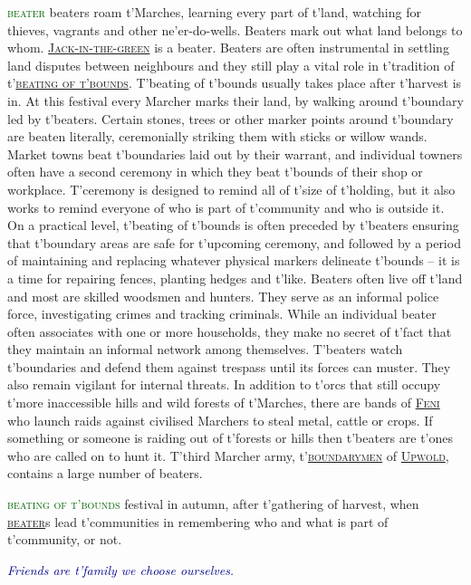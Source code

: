 \documentclass[twoside,11pt,b5paper,twocolumn]{scrbook}
\newcommand{\estcab}[1]{\textsc{\textcolor{marron}{#1}}}
\newcommand{\keyword}[1]{\textcolor{darkgreen}{#1}}
\renewcommand{\paragraph}[1]{\par\noindent\markboth{#1}{#1}\estcab{\keyword{#1}}\label{#1} }
\newcommand{\see}[1]{{\estcab{\hyperref[#1]{#1}}}}
\newcommand{\proverb}[1]{\par \textcolor{darkblue}{\itshape #1}}
\begin{document}
\paragraph{beater} beaters roam t'Marches, learning every part of t'land, watching for thieves, vagrants and other ne'er-do-wells. Beaters mark out what land belongs to whom. \see{Jack-in-the-green} is a beater. Beaters are often instrumental in settling land disputes between neighbours and they still play a vital role in t'tradition of t'\see{beating of t'bounds}. T'beating of t'bounds usually takes place after t'harvest is in. At this festival every Marcher marks their land, by walking around t'boundary led by t'beaters. Certain stones, trees or other marker points around t'boundary are beaten literally, ceremonially striking them with sticks or willow wands. Market towns beat t'boundaries laid out by their warrant, and individual towners often have a second ceremony in which they beat t'bounds of their shop or workplace. T'ceremony is designed to remind all of t'size of t'holding, but it also works to remind everyone of who is part of t'community and who is outside it. On a practical level, t'beating of t'bounds is often preceded by t'beaters ensuring that t'boundary areas are safe for t'upcoming ceremony, and followed by a period of maintaining and replacing whatever physical markers delineate t'bounds – it is a time for repairing fences, planting hedges and t'like. Beaters often live off t'land and most are skilled woodsmen and hunters. They serve as an informal police force, investigating crimes and tracking criminals. While an individual beater often associates with one or more households, they make no secret of t'fact that they maintain an informal network among themselves. T'beaters watch t'boundaries and defend them against trespass until its forces can muster. They also remain vigilant for internal threats. In addition to t'orcs that still occupy t'more inaccessible hills and wild forests of t'Marches, there are bands of \see{Feni} who launch raids against civilised Marchers to steal metal, cattle or crops. If something or someone is raiding out of t'forests or hills then t'beaters are t'ones who are called on to hunt it. T'third Marcher army, t'\see{boundarymen} of \see{Upwold}, contains a large number of beaters.
\paragraph{beating of t'bounds} festival in autumn, after t'gathering of harvest, when \see{beater}s lead t'communities in remembering who and what is part of t'community, or not. \proverb{Friends are t'family we choose ourselves.}
\end{document}
